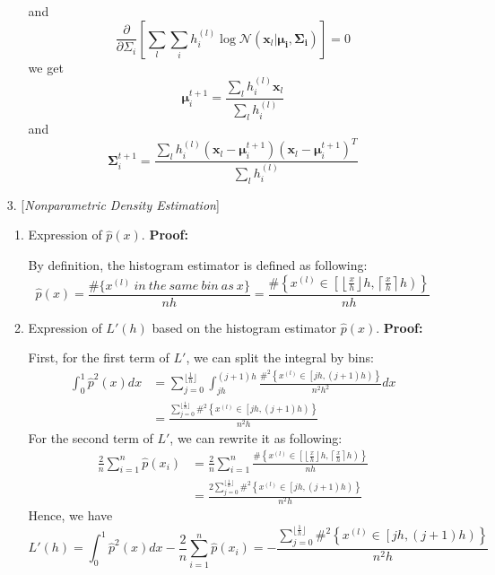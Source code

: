 \documentclass{article}
\renewcommand{\b}[1]{\bm{#1}}
\newcommand{\PARTIAL}[2]{\frac{\partial #1}{\partial #2}}
\begin{document}
\begin{enumerate}
\begin{enumerate}
            and 
            \[\PARTIAL{}{\Sigma_i}\left[\sum_l\sum_ih_i^{(l)}\log{\mathcal{N}(\b{x}_l|\b{\mu_i,\Sigma_i})}\right]=0\]
            we get 
            \[\b{\mu}_i^{t+1}=\frac{\sum_lh_i^{(l)}\b{x}_l}{\sum_lh_i^{(l)}}\]
            and 
            \[\b{\Sigma}_i^{t+1}=\frac{\sum_lh_i^{(l)}(\b{x}_l-\b{\mu}_i^{t+1})(\b{x}_l-\b{\mu}_i^{t+1})^T}{\sum_lh_i^{(l)}}\]
	      \end{enumerate}
	\item [3.] [\textit{Nonparametric Density Estimation}]
	      \begin{enumerate}
		      \setlength\parindent{2em}
		      \item Expression of $\hat{p}(x)$.\newline
		      {\bf Proof:}
          \par By definition, the histogram estimator is defined as following:
          \[\hat{p}(x)=\frac{\#\{x^{(l)}\ in\ the\ same\ bin\ as\ x\}}{nh}=\frac{\#\left\{x^{(l)}\in\left[\left\lfloor{\frac{x}{h}}\right\rfloor h,\left\lceil{\frac{x}{h}}\right\rceil h\right)\right\}}{nh}\]
		      \item Expression of $L'(h)$ based on the histogram estimator $\hat{p}(x)$.\newline
		      {\bf Proof:}
		      \par First, for the first term of $L'$, we can split the integral by bins:
          \begin{align*}
            \int_0^1\hat{p}^2(x)dx &= \sum_{j=0}^{\lfloor\frac{1}{h}\rfloor}\int_{jh}^{(j+1)h}\frac{\#^2\left\{x^{(l)}\in\left[jh, (j+1)h\right)\right\}}{n^2h^2}dx\\
            &= \frac{\sum_{j=0}^{\lfloor\frac{1}{h}\rfloor}\#^2\left\{x^{(l)}\in\left[jh, (j+1)h\right)\right\}}{n^2h}
          \end{align*}
          For the second term of $L'$, we can rewrite it as following:
          \begin{align*}
            \frac{2}{n}\sum_{i=1}^n\hat{p}(x_i) &= \frac{2}{n}\sum_{i=1}^n\frac{\#\left\{x^{(l)}\in\left[\left\lfloor{\frac{x}{h}}\right\rfloor h,\left\lceil{\frac{x}{h}}\right\rceil h\right)\right\}}{nh}\\
            &= \frac{2\sum_{j=0}^{\lfloor\frac{1}{h}\rfloor}\#^2\left\{x^{(l)}\in\left[jh, (j+1)h\right)\right\}}{n^2h}
          \end{align*}
          Hence, we have
          \[L'(h)=\int_0^1\hat{p}^2(x)dx-\frac{2}{n}\sum_{i=1}^n\hat{p}(x_i)=-\frac{\sum_{j=0}^{\lfloor\frac{1}{h}\rfloor}\#^2\left\{x^{(l)}\in\left[jh, (j+1)h\right)\right\}}{n^2h}\]

\end{enumerate}
\end{enumerate}
\end{document}
